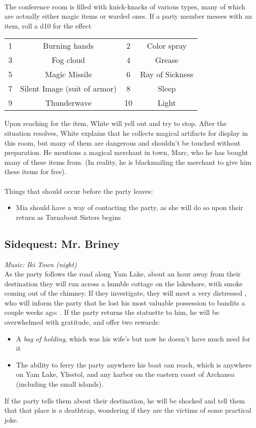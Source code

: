 \\
The conference room is filled with knick-knacks of various types, many of which are actually either magic items or warded ones. If a party member messes with an item, roll a d10 for the effect
\begin{tabular}{c c|c c}
1 & Burning hands & 2 & Color spray \\
3 & Fog cloud & 4 & Grease \\
5 & Magic Missile & 6 & Ray of Sickness \\
7 & Silent Image (suit of armor) & 8 & Sleep \\
9 & Thunderwave & 10 & Light \end{tabular}
Upon reaching for the item, White will yell out and try to stop. After the situation resolves, White explains that he collects magical artifacts for display in this room, but many of them are dangerous and shouldn't be touched without preparation. He mentions a magical merchant in town, Marc, who he has bought many of these items from. (In reality, he is blackmailing the merchant to give him these items for free).\\
\\
Things that should occur before the party leaves:
\begin{itemize}
\item Mia should have a way of contacting the party, as she will do so upon their return as Turnabout Sisters begins
\end{itemize}
\subsection{Sidequest: Mr. Briney}
\textit{Music: Iki Town (night)}\\
As the party follows the road along Yam Lake, about an hour away from their destination they will run across a humble cottage on the lakeshore, with smoke coming out of the chimney. If they investigate, they will meet a very distressed , who will inform the party that he lost his most valuable possession to bandits a couple weeks ago: . If the party returns the statuette to him, he will be overwhelmed with gratitude, and offer two rewards:
\begin{itemize}
\item A \textit{bag of holding}, which was his wife's but now he doesn't have much need for it
\item The ability to ferry the party anywhere his boat can reach, which is anywhere on Yam Lake, Ylisstol, and any harbor on the eastern coast of Archanea (including the small islands).
\end{itemize}
If the party tells them about their destination, he will be shocked and tell them that that place is a deathtrap, wondering if they are the victims of some practical joke.
